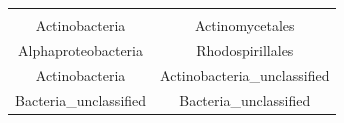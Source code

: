 \documentclass[]{article}
\begin{document}
\begin{longtable}[]{@{}cc@{}}
\begin{minipage}[t]{0.38\columnwidth}
\end{minipage}\tabularnewline
\begin{minipage}[t]{0.38\columnwidth}\centering\strut
Actinobacteria\strut
\end{minipage} & \begin{minipage}[t]{0.38\columnwidth}\centering\strut
Actinomycetales\strut
\end{minipage}\tabularnewline
\begin{minipage}[t]{0.38\columnwidth}\centering\strut
Alphaproteobacteria\strut
\end{minipage} & \begin{minipage}[t]{0.38\columnwidth}\centering\strut
Rhodospirillales\strut
\end{minipage}\tabularnewline
\begin{minipage}[t]{0.38\columnwidth}\centering\strut
Actinobacteria\strut
\end{minipage} & \begin{minipage}[t]{0.38\columnwidth}\centering\strut
Actinobacteria\_unclassified\strut
\end{minipage}\tabularnewline
\begin{minipage}[t]{0.38\columnwidth}\centering\strut
Bacteria\_unclassified\strut
\end{minipage} & \begin{minipage}[t]{0.38\columnwidth}\centering\strut
Bacteria\_unclassified\strut
\end{minipage}\tabularnewline
\bottomrule
\end{longtable}
\end{document}
